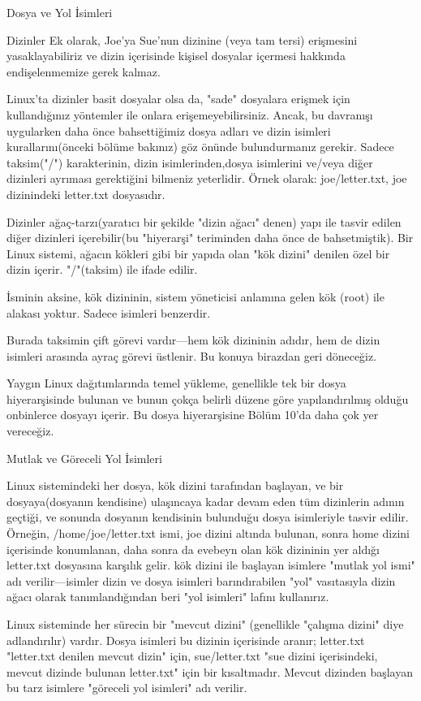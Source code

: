 \documentclass[10pt,a5paper]{book}
\begin{document}
\begin{section}{Dosya ve Yol İsimleri}
\begin{subsection}{Dizinler}
	Ek olarak, Joe'ya Sue'nun dizinine (veya tam tersi) erişmesini yasaklayabiliriz ve dizin içerisinde kişisel dosyalar içermesi hakkında endişelenmemize gerek kalmaz.
	
	Linux'ta dizinler basit dosyalar olsa da, "sade" dosyalara erişmek için kullandığınız yöntemler ile onlara erişemeyebilirsiniz. Ancak, bu davranışı uygularken daha önce bahsettiğimiz dosya adları ve dizin isimleri kurallarını(önceki bölüme bakınız) göz önünde bulundurmanız gerekir. Sadece taksim("/") karakterinin, dizin isimlerinden,dosya isimlerini ve/veya diğer dizinleri ayrıması gerektiğini bilmeniz yeterlidir. Örnek olarak: joe/letter.txt, joe dizinindeki letter.txt dosyasıdır.
	
	Dizinler ağaç-tarzı(yaratıcı bir şekilde "dizin ağacı"  denen) yapı ile tasvir edilen diğer dizinleri içerebilir(bu "hiyerarşi" teriminden daha önce de bahsetmiştik). Bir Linux sistemi, ağacın kökleri gibi bir yapıda olan "kök dizini" denilen özel bir dizin içerir.  "/"(taksim) ile ifade edilir.
	
	İsminin aksine, kök dizininin, sistem yöneticisi anlamına gelen kök (root) ile alakası yoktur. Sadece isimleri benzerdir.
	
	Burada taksimin çift görevi vardır—hem kök dizininin adıdır, hem de dizin isimleri arasında ayraç görevi üstlenir. Bu konuya birazdan geri döneceğiz.
	
	Yaygın Linux dağıtımlarında temel yükleme, genellikle tek bir dosya hiyerarşisinde bulunan ve bunun çokça belirli düzene göre yapılandırılmış olduğu onbinlerce dosyayı içerir. Bu dosya hiyerarşisine Bölüm 10'da daha çok yer vereceğiz.
\end{subsection}
\begin{subsection}{Mutlak ve Göreceli Yol İsimleri}

Linux sistemindeki her dosya, kök dizini tarafından başlayan, ve bir dosyaya(dosyanın kendisine) ulaşıncaya kadar devam eden tüm dizinlerin adının geçtiği, ve sonunda dosyanın kendisinin bulunduğu dosya isimleriyle tasvir edilir. Örneğin, /home/joe/letter.txt ismi, joe dizini altında bulunan, sonra home dizini içerisinde konumlanan, daha sonra da evebeyn olan kök dizininin yer aldığı letter.txt dosyasına karşılık gelir. kök dizini ile başlayan isimlere "mutlak yol ismi" adı verilir—isimler dizin ve dosya isimleri barındırabilen "yol" vasıtasıyla dizin ağacı olarak tanımlandığından beri "yol isimleri" lafını kullanırız.

	Linux sisteminde her sürecin bir "mevcut dizini" (genellikle "çalışma dizini" diye adlandırılır) vardır. Dosya isimleri bu dizinin içerisinde aranır; letter.txt "letter.txt denilen mevcut dizin" için, sue/letter.txt "sue dizini içerisindeki, mevcut dizinde bulunan letter.txt" için bir kısaltmadır. Mevcut dizinden başlayan bu tarz isimlere "göreceli yol isimleri" adı verilir.
	

\end{subsection}
\end{section}
\end{document}
